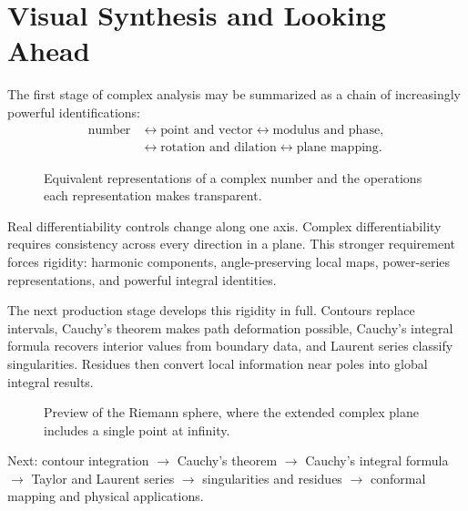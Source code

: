 \section{Visual Synthesis and Looking Ahead}
\label{sec:ch5-visual-synthesis}

The first stage of complex analysis may be summarized as a chain of increasingly powerful identifications:
\begin{align*}
\text{number}&\longleftrightarrow\text{point and vector}
\longleftrightarrow\text{modulus and phase},\\
&\longleftrightarrow\text{rotation and dilation}
\longleftrightarrow\text{plane mapping}.
\end{align*}

\begin{figure}[htbp]
\centering

\caption{Equivalent representations of a complex number and the operations each representation makes transparent.}
\label{fig:ch5-representation-map}
\end{figure}

\begin{keyidea}
Real differentiability controls change along one axis. Complex differentiability requires consistency across every direction in a plane. This stronger requirement forces rigidity: harmonic components, angle-preserving local maps, power-series representations, and powerful integral identities.
\end{keyidea}

The next production stage develops this rigidity in full. Contours replace intervals, Cauchy's theorem makes path deformation possible, Cauchy's integral formula recovers interior values from boundary data, and Laurent series classify singularities. Residues then convert local information near poles into global integral results.

\begin{figure}[htbp]
\centering

\caption{Preview of the Riemann sphere, where the extended complex plane includes a single point at infinity.}
\label{fig:ch5-riemann-sphere-preview}
\end{figure}

\begin{roadmapbox}
Next: contour integration $\longrightarrow$ Cauchy's theorem $\longrightarrow$ Cauchy's integral formula $\longrightarrow$ Taylor and Laurent series $\longrightarrow$ singularities and residues $\longrightarrow$ conformal mapping and physical applications.
\end{roadmapbox}
